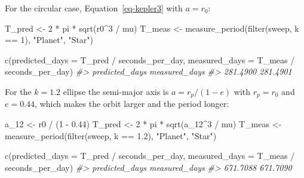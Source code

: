 \documentclass[
  10.5pt,
  letterpaper,
]{scrbook}
\newenvironment{Shaded}{\begin{snugshade}}{\end{snugshade}}
\newcommand{\AttributeTok}[1]{\textcolor[rgb]{0.00,0.00,0.00}{#1}}
\newcommand{\CommentTok}[1]{\textcolor[rgb]{0.00,0.00,0.00}{\textit{#1}}}
\newcommand{\DecValTok}[1]{\textcolor[rgb]{0.00,0.00,0.00}{#1}}
\newcommand{\FloatTok}[1]{\textcolor[rgb]{0.00,0.00,0.00}{#1}}
\newcommand{\FunctionTok}[1]{\textcolor[rgb]{0.00,0.00,0.00}{#1}}
\newcommand{\NormalTok}[1]{\textcolor[rgb]{0.00,0.00,0.00}{#1}}
\newcommand{\OtherTok}[1]{\textcolor[rgb]{0.00,0.00,0.00}{#1}}
\newcommand{\SpecialCharTok}[1]{\textcolor[rgb]{0.00,0.00,0.00}{#1}}
\newcommand{\StringTok}[1]{\textcolor[rgb]{0.00,0.00,0.00}{#1}}
\theoremstyle{plain}
\theoremstyle{remark}
\begin{document}
For the circular case, Equation~\ref{eq-kepler3} with \(a = r_0\):

\begin{Shaded}
\begin{Highlighting}[]
\NormalTok{T\_pred }\OtherTok{\textless{}{-}} \DecValTok{2} \SpecialCharTok{*}\NormalTok{ pi }\SpecialCharTok{*} \FunctionTok{sqrt}\NormalTok{(r0}\SpecialCharTok{\^{}}\DecValTok{3} \SpecialCharTok{/}\NormalTok{ mu)}
\NormalTok{T\_meas }\OtherTok{\textless{}{-}} \FunctionTok{measure\_period}\NormalTok{(}\FunctionTok{filter}\NormalTok{(sweep, k }\SpecialCharTok{==} \DecValTok{1}\NormalTok{), }\StringTok{"Planet"}\NormalTok{, }\StringTok{"Star"}\NormalTok{)}

\FunctionTok{c}\NormalTok{(}\AttributeTok{predicted\_days =}\NormalTok{ T\_pred }\SpecialCharTok{/}\NormalTok{ seconds\_per\_day,}
  \AttributeTok{measured\_days  =}\NormalTok{ T\_meas }\SpecialCharTok{/}\NormalTok{ seconds\_per\_day)}
\CommentTok{\#\textgreater{} predicted\_days  measured\_days }
\CommentTok{\#\textgreater{}       281.4900       281.4901}
\end{Highlighting}
\end{Shaded}

For the \(k = 1.2\) ellipse the semi-major axis is \(a = r_p/(1-e)\)
with \(r_p = r_0\) and \(e = 0.44\), which makes the orbit larger and
the period longer:

\begin{Shaded}
\begin{Highlighting}[]
\NormalTok{a\_12   }\OtherTok{\textless{}{-}}\NormalTok{ r0 }\SpecialCharTok{/}\NormalTok{ (}\DecValTok{1} \SpecialCharTok{{-}} \FloatTok{0.44}\NormalTok{)}
\NormalTok{T\_pred }\OtherTok{\textless{}{-}} \DecValTok{2} \SpecialCharTok{*}\NormalTok{ pi }\SpecialCharTok{*} \FunctionTok{sqrt}\NormalTok{(a\_12}\SpecialCharTok{\^{}}\DecValTok{3} \SpecialCharTok{/}\NormalTok{ mu)}
\NormalTok{T\_meas }\OtherTok{\textless{}{-}} \FunctionTok{measure\_period}\NormalTok{(}\FunctionTok{filter}\NormalTok{(sweep, k }\SpecialCharTok{==} \FloatTok{1.2}\NormalTok{), }\StringTok{"Planet"}\NormalTok{, }\StringTok{"Star"}\NormalTok{)}

\FunctionTok{c}\NormalTok{(}\AttributeTok{predicted\_days =}\NormalTok{ T\_pred }\SpecialCharTok{/}\NormalTok{ seconds\_per\_day,}
  \AttributeTok{measured\_days  =}\NormalTok{ T\_meas }\SpecialCharTok{/}\NormalTok{ seconds\_per\_day)}
\CommentTok{\#\textgreater{} predicted\_days  measured\_days }
\CommentTok{\#\textgreater{}       671.7088       671.7090}
\end{Highlighting}
\end{Shaded}
\end{document}
